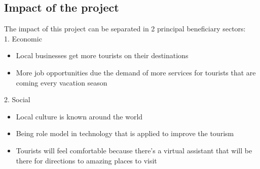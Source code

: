 \subsection{Impact of the project}
The impact of this project can be separated in 2 principal beneficiary sectors:\\

1. Economic
  \begin{itemize}
    \item Local businesses get more tourists on their destinations
    \item More job opportunities due the demand of more services for tourists that are coming every vacation season
  \end{itemize}

2. Social 
\begin{itemize}
    \item Local culture is known around the world 
    \item Being role model in technology that is applied to improve the tourism
    \item Tourists will feel comfortable because there's a virtual assistant that will be there for directions to 
          amazing places to visit
\end{itemize}
